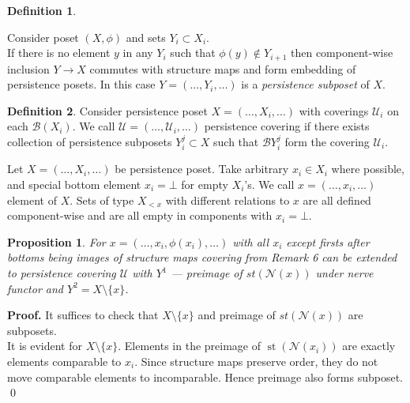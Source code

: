\documentclass[a4paper, 12pt]{article}
\newtheorem{proposition}{Proposition}
\theoremstyle{definition}
\newtheorem{definition}{Definition}
\theoremstyle{remark}
\newenvironment{pf}{\noindent\textbf{Proof.}}{\qed}
\newcommand{\define}[1]{{\textit{#1}}}
\begin{document}
\begin{definition} ~ \par
  Consider poset $(X,\phi)$ and sets $Y_i \subset X_i$.\\

  If there is no element $y$ in any $Y_i$ such that $\phi(y) \not\in Y_{i+1}$ then component-wise inclusion $Y \to X$ commutes with structure maps and form embedding of persistence posets. In this case $Y=(\ldots,Y_i,\ldots)$ is a \define {persistence subposet} of $X$.
\end{definition}

\begin{definition}
  Consider persistence poset $X = (\ldots,X_i,\ldots)$ with coverings $\mathcal{U}_i$ on each $\mathcal{B}(X_i)$. We call $\mathcal{U} = (\ldots,\mathcal{U}_i,\ldots)$ persistence covering if there exists collection of persistence subposets $Y^j_i \subset X$ such that $\mathcal{B}Y^j_i$ form the covering $\mathcal{U}_i$.\\
\end{definition}

Let $X=(\ldots,X_i,\ldots)$ be persistence poset. Take arbitrary $x_i \in X_i$ where possible, and special bottom element $x_i = \bot$ for empty $X_i$'s. We call $x = (\ldots, x_i, \ldots)$ element of $X$. Sets of type $X_{<x}$ with different relations to $x$ are all defined component-wise and are all empty in components with $x_i = \bot$.\\

\begin{proposition}
  For $x = (\ldots,x_i,\phi(x_i),\ldots)$ with all $x_i$ except firsts after bottoms being images of structure maps covering from Remark 6 can be extended to persistence covering $\mathcal{U}$ with $Y^1$ --- preimage of $st(\mathcal{N}(x))$ under nerve functor and $Y^2 = X \setminus \{x\}$.
\end{proposition}

\begin{pf}
  It suffices to check that $X \setminus \{x\}$ and preimage of $st(\mathcal{N}(x))$ are subposets.\\

  It is evident for $X \setminus \{x\}$. Elements in the preimage of $\operatorname{st}(\mathcal{N}(x_i))$ are exactly elements comparable to $x_i$. Since structure maps preserve order, they do not move comparable elements to incomparable. Hence preimage also forms subposet.
\end{pf}\\
\end{document}
